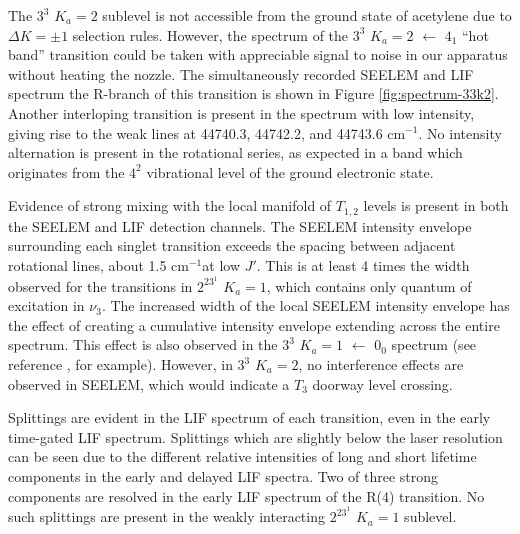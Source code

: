 \documentclass[12pt]{mitthesis}
\newcommand{\rcm}{cm$^{-1}$}
\newcommand{\Ka}[1]{$K_a\!\!=\!#1$}
\begin{document}
The $3^3$ \Ka{2} sublevel is not accessible from the ground state of
acetylene due to $\Delta K = \pm 1$ selection rules.  However, the
spectrum of the $3^3$ \Ka{2} $\leftarrow$ $4_1$ ``hot band''
transition could be taken with appreciable signal to noise in our
apparatus without heating the nozzle.  The simultaneously recorded
SEELEM and LIF spectrum the R-branch of this transition is shown in
Figure \ref{fig:spectrum-33k2}.  Another interloping transition is
present in the spectrum with low intensity, giving rise to the weak
lines at 44740.3, 44742.2, and 44743.6 \rcm.  No intensity alternation
is present in the rotational series, as expected in a band which
originates from the $4^2$ vibrational level of the ground electronic
state.

Evidence of strong mixing with the local manifold of $T_{1,2}$ levels
is present in both the SEELEM and LIF detection channels.  The SEELEM
intensity envelope surrounding each singlet transition exceeds the
spacing between adjacent rotational lines, about 1.5 \rcm at low $J'$.
This is at least 4 times the width observed for the transitions in
$2^23^1$ \Ka{1}, which contains only quantum of excitation in $\nu_3$.
The increased width of the local SEELEM intensity envelope has the
effect of creating a cumulative intensity envelope extending across
the entire spectrum.  This effect is also observed in the $3^3$ \Ka{1}
$\leftarrow$ $0_0$ spectrum (see reference \cite{humphrey97}, for
example).  However, in $3^3$ \Ka{2}, no interference effects are
observed in SEELEM, which would indicate a $T_3$ doorway level
crossing.

Splittings are evident in the LIF spectrum of each transition, even in
the early time-gated LIF spectrum.  Splittings which are slightly
below the laser resolution can be seen due to the different relative
intensities of long and short lifetime components in the early and
delayed LIF spectra.  Two of three strong components are resolved in
the early LIF spectrum of the R(4) transition.  No such splittings are
present in the weakly interacting $2^23^1$ \Ka{1} sublevel.

\end{document}
